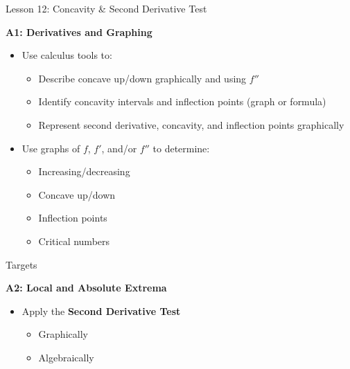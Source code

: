 \documentclass[dvipsnames]{beamer}
\begin{document}


\begin{frame}{Lesson 12: Concavity \& Second Derivative Test}

\textbf{\color{RedOrange} A1: Derivatives and Graphing}

\begin{itemize}
\item Use calculus tools to:
\begin{itemize}
    \item Describe concave up/down graphically and using $f''$
    \item Identify concavity intervals and inflection points (graph or formula)
    \item Represent second derivative, concavity, and inflection points graphically
\end{itemize}
\item Use graphs of $f$, $f'$, and/or $f''$ to determine:
\begin{itemize}
    \item Increasing/decreasing
    \item Concave up/down
    \item Inflection points
    \item Critical numbers
\end{itemize}
\end{itemize}
\end{frame}

\begin{frame}{Targets}

\textbf{\color{RedOrange} A2: Local and Absolute Extrema}

\begin{itemize}
\item Apply the \textbf{Second Derivative Test}
\begin{itemize}
    \item Graphically
    \item Algebraically
\end{itemize}
\end{itemize}
\end{frame}
\end{document}
